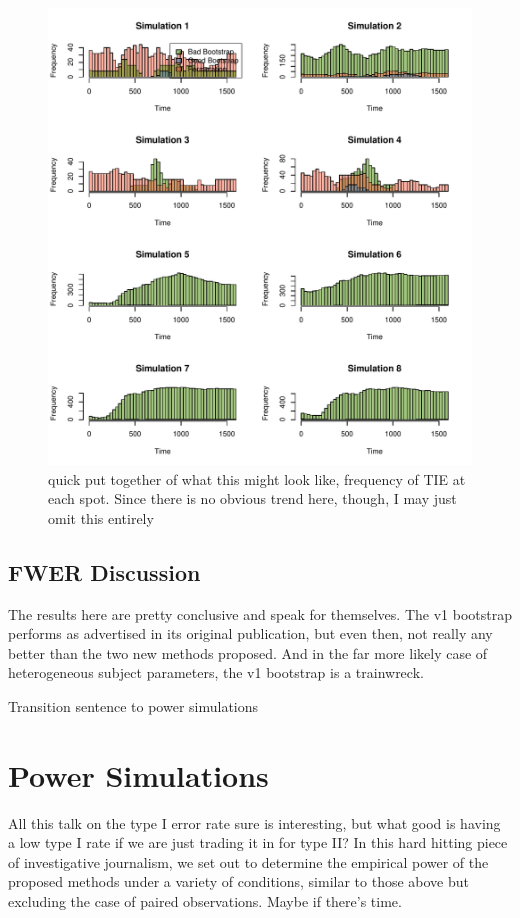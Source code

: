 \documentclass{article}
\begin{document}
\begin{figure}[H]
\centering
\includegraphics{TEMP_histogram.pdf}
\caption{quick put together of what this might look like, frequency of TIE at each spot. Since there is no obvious trend here, though, I may just omit this entirely}
\label{fig:time_slice_histogram}
\end{figure}

\subsection{FWER Discussion}

The results here are pretty conclusive and speak for themselves. The v1 bootstrap performs as advertised in its original publication, but even then, not really any better than the two new methods proposed. And in the far more likely case of heterogeneous subject parameters, the v1 bootstrap is a trainwreck.

Transition sentence to power simulations

\section{Power Simulations}


All this talk on the type I error rate sure is interesting, but what good is having a low type I rate if we are just trading it in for type II? In this hard hitting piece of investigative journalism, we set out to determine the empirical power of the proposed methods under a variety of conditions, similar to those above but excluding the case of paired observations. Maybe if there's time.
\end{document}
